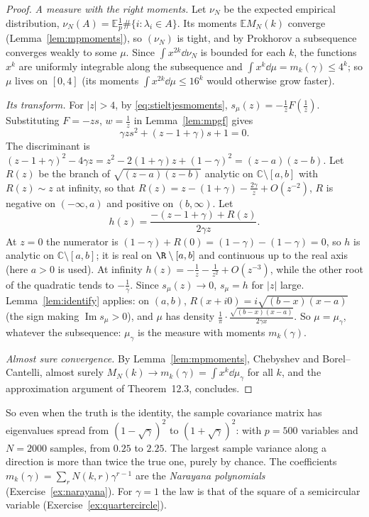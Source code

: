 \begin{proof}
\emph{A measure with the right moments.} Let $\nu_N$ be the expected empirical distribution, $\nu_N(A)=\mathbb E\frac1p\#\{i:\lambda_i\in A\}$. Its moments $\mathbb EM_N(k)$ converge (Lemma~\ref{lem:mpmoments}), so $(\nu_N)$ is tight, and by
Prokhorov a subsequence converges weakly to some $\mu$. Since $\int x^{2k}\dd\nu_N$ is bounded for each $k$, the functions $x^k$ are uniformly integrable along the subsequence and $\int x^k\dd\mu=m_k(\gamma)\le4^k$; so $\mu$
lives on $[0,4]$ (its moments $\int x^{2k}\dd\mu\le16^k$ would otherwise grow faster).

\emph{Its transform.} For $|z|>4$, by \eqref{eq:stieltjesmoments}, $s_\mu(z)=-\frac1zF(\frac1z)$. Substituting $F=-zs$, $w=\frac1z$ in Lemma~\ref{lem:mpgf} gives
\[
\gamma zs^2+(z-1+\gamma)s+1=0.
\]
The discriminant is $(z-1+\gamma)^2-4\gamma z=z^2-2(1+\gamma)z+(1-\gamma)^2=(z-a)(z-b)$. Let $R(z)$ be the branch of $\sqrt{(z-a)(z-b)}$ analytic on $\mathbb C\setminus[a,b]$ with $R(z)\sim z$ at infinity, so that
$R(z)=z-(1+\gamma)-\frac{2\gamma}z+O(z^{-2})$, $R$ is negative on $(-\infty,a)$ and positive on $(b,\infty)$. Let
\[
h(z)=\frac{-(z-1+\gamma)+R(z)}{2\gamma z}.
\]
At $z=0$ the numerator is $(1-\gamma)+R(0)=(1-\gamma)-(1-\gamma)=0$, so $h$ is analytic on $\mathbb C\setminus[a,b]$; it is real on $\R\setminus[a,b]$ and continuous up to the real axis (here $a>0$ is used). At infinity
$h(z)=-\frac1z-\frac1{z^2}+O(z^{-3})$, while the other root of the quadratic tends to $-\frac1\gamma$. Since $s_\mu(z)\to0$, $s_\mu=h$ for $|z|$ large. Lemma~\ref{lem:identify} applies: on $(a,b)$, $R(x+i0)=i\sqrt{(b-x)(x-a)}$
(the sign making $\operatorname{Im}s_\mu>0$), and $\mu$ has density $\frac1\pi\cdot\frac{\sqrt{(b-x)(x-a)}}{2\gamma x}$. So $\mu=\mu_\gamma$, whatever the subsequence: $\mu_\gamma$ is the measure with moments $m_k(\gamma)$.

\emph{Almost sure convergence.} By Lemma~\ref{lem:mpmoments}, Chebyshev and Borel--Cantelli, almost surely $M_N(k)\to m_k(\gamma)=\int x^k\dd\mu_\gamma$ for all $k$, and the approximation argument of Theorem~12.3, concludes.
\end{proof}

So even when the truth is the identity, the sample covariance matrix has eigenvalues spread from $(1-\sqrt\gamma)^2$ to $(1+\sqrt\gamma)^2$: with $p=500$ variables and $N=2000$ samples, from $0.25$ to $2.25$. The largest sample
variance along a direction is more than twice the true one, purely by chance. The coefficients $m_k(\gamma)=\sum_rN(k,r)\gamma^{r-1}$ are the \emph{Narayana polynomials} (Exercise~\ref{ex:narayana}). For $\gamma=1$ the law is that
of the square of a semicircular variable (Exercise~\ref{ex:quartercircle}).

